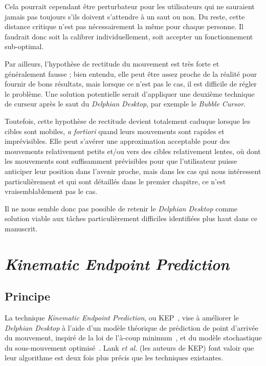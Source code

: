 	Cela pourrait cependant être perturbateur pour les utilisateurs qui ne sauraient jamais pas toujours s'ils doivent s'attendre à un \og saut \fg{} ou non. Du reste, cette distance critique n'est pas nécessairement la même pour chaque personne. Il faudrait donc soit la calibrer individuellement, soit accepter un fonctionnement sub-optimal.
	
	Par ailleurs, l'hypothèse de rectitude du mouvement est très forte et généralement fausse ; bien entendu, elle peut être assez proche de la réalité pour fournir de bons résultats, mais lorsque ce n'est pas le cas, il est difficile de régler le problème. Une solution potentielle serait d'appliquer une deuxième technique de curseur après le saut du \emph{Delphian Desktop}, par exemple le \emph{Bubble Cursor}.
	
	Toutefois, cette hypothèse de rectitude devient totalement caduque lorsque les cibles sont mobiles, \emph{a fortiori} quand leurs mouvements sont rapides et imprévisibles. Elle peut s'avérer une approximation acceptable pour des mouvements relativement petits et/ou vers des cibles relativement lentes, où dont les mouvements sont suffisamment prévisibles pour que l'utilisateur puisse anticiper leur position dans l'avenir proche, mais dans les cas qui nous intéressent particulièrement et qui sont détaillés dans le premier chapitre, ce n'est vraisemblablement pas le cas.
	
	Il ne nous semble donc pas possible de retenir le \emph{Delphian Desktop} comme solution viable aux tâches particulièrement difficiles identifiées plus haut dans ce manuscrit.
	
\section{\emph{Kinematic Endpoint Prediction}}
	\subsection{Principe}
	La technique \emph{Kinematic Endpoint Prediction}, ou KEP~\cite{lank2007endpoint}, vise à améliorer le \emph{Delphian Desktop} à l'aide d'un modèle théorique de prédiction de point d'arrivée du mouvement, inspiré de la loi de l'à-coup minimum~\cite{hogan1984organizing, richardson2002comparing}\footnotemark{}, et du modèle stochastique du sous-mouvement optimisé~\cite{meyer1990speed}. Lank \emph{et al.} (les auteurs de KEP) font valoir que leur algorithme est deux fois plus précis que les techniques existantes.
	
